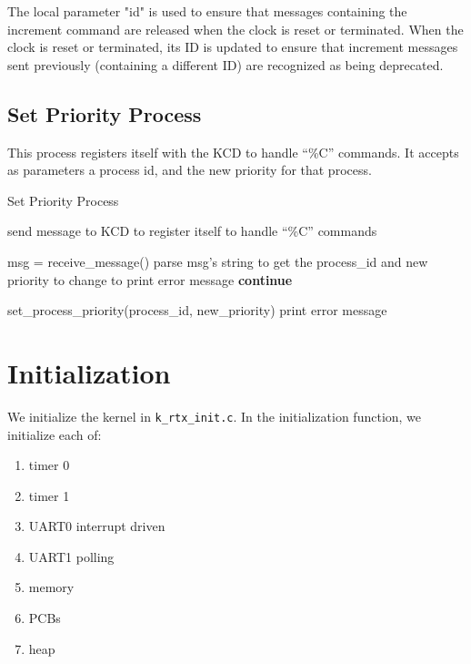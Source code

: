 \documentclass[12pt]{report}
\begin{document}
The local parameter "id" is used to ensure that messages containing the increment command are released when the clock is reset or terminated.  When the clock is reset or terminated, its ID is updated to ensure that increment messages sent previously (containing a different ID) are recognized as being deprecated.

\subsection{Set Priority Process}

This process registers itself with the KCD to handle ``\%C'' commands. It accepts as parameters a process id, and the new priority for that process.

\begin{algorithm}[H]
	\caption{Set Priority Process}
	\begin{algorithmic}[1]
	  	\State send message to KCD to register itself to handle ``\%C'' commands

	  		\State msg = receive_message()
	  		\State parse msg's string to get the process_id and new priority to change to
	  			\State print error message
	  			\State \textbf{continue}
	  		\EndIf

	  		\State set_process_priority(process_id, new_priority)
	  			\State print error message
	  		\EndIf
	  	\EndWhile
	  \EndFunction
	\end{algorithmic}
\end{algorithm}



\section{Initialization}

We initialize the kernel in \texttt{k\_rtx\_init.c}. In the initialization function, we initialize each of:
\begin{enumerate}
	\item timer 0
	\item timer 1
	\item UART0 interrupt driven
	\item UART1 polling
	\item memory
	\item PCBs
	\item heap 
\end{enumerate}
\end{document}
